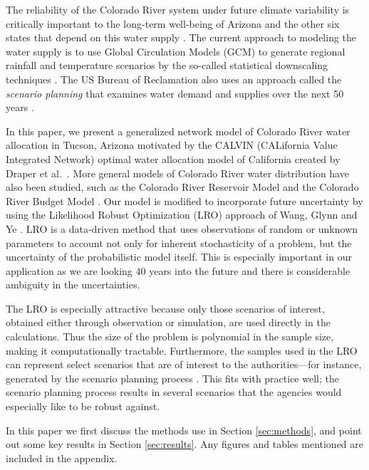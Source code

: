 \documentclass[12pt]{amsart}
\begin{document}
The reliability of the Colorado River system under future climate variability is critically important to the long-term well-being of Arizona and the other six states that depend on this water supply \cite{usbr_colorado_climate}. 
The current approach to modeling the water supply is to use Global Circulation Models (GCM) to generate regional rainfall and temperature scenarios by the so-called statistical downscaling techniques \cite{christensen_lettenmaier_07,dibike_caulibaly_05}.  
The US Bureau of Reclamation also uses an approach called the {\it scenario planning} that examines water demand and supplies over the next 50 years \cite{usbr_11}.

In this paper, we present a generalized network model of Colorado River water allocation in Tucson, Arizona motivated by the CALVIN (CALifornia Value Integrated Network) optimal water allocation model of California created by Draper et al.\ \cite{draper_etal_03}.
More general models of Colorado River water distribution have also been studied, such as the Colorado River Reservoir Model \cite{christensen2004effects} and the Colorado River Budget Model \cite{barnett2009sustainable}.
Our model is modified to incorporate future uncertainty by using the Likelihood Robust Optimization (LRO) approach of Wang, Glynn and Ye \cite{wang2010likelihood}.
LRO is a data-driven method that uses observations of random or unknown parameters to account not only for inherent stochasticity of a problem, but the uncertainty of the probabilistic model itself.
This is especially important in our application as we are looking 40 years into the future and there is considerable ambiguity in the uncertainties.

The LRO is especially attractive because only those scenarios of interest, obtained either through observation or simulation, are used directly in the calculations.
Thus the size of the problem is polynomial in the sample size, making it computationally tractable.
Furthermore, the samples used in the LRO can represent select scenarios that are of interest to the authorities---for instance, generated by the scenario planning process \cite{cityofTucsonWaterPlan,usbr_11}.
This fits with practice well; the scenario planning process results in several scenarios that the agencies would especially like to be robust against.

In this paper we first discuss the methods use in Section \ref{sec:methods}, and point out some key results in Section \ref{sec:results}.
Any figures and tables mentioned are included in the appendix.
\end{document}
